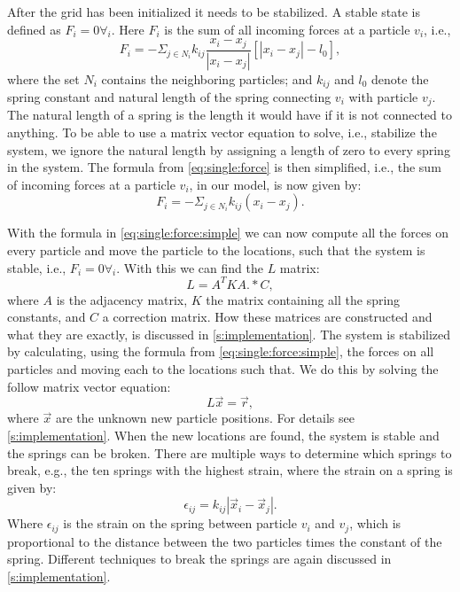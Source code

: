 After the grid has been initialized it needs to be stabilized. A stable state is defined as $F_i = 0 \forall_i$. Here $F_i$ is the sum of all incoming forces at a particle $v_i$, i.e.,
%
\begin{equation}\label{eq:single:force}
	F_i = - \Sigma_{j \in N_i} k_{ij} \frac{x_i - x_j}{|x_i - x_j|}[|x_i - x_j| - l_0],
\end{equation}
%
where the set $N_i$ contains the neighboring particles; and $k_{ij}$ and $l_0$ denote the spring constant and natural length of the spring connecting $v_i$ with 
particle $v_j$. The natural length of a spring is the length it would have if it is not connected to anything. To be able to use a matrix vector equation to solve, i.e., stabilize the system, we ignore the natural length by assigning a length of zero to every spring in the system. The formula from \eqref{eq:single:force} is then simplified, i.e., the sum of incoming forces at a particle $v_i$, in our model, is now given by:
%
\begin{equation}\label{eq:single:force:simple}
	F_i = - \Sigma_{j \in N_i} k_{ij}(x_i - x_j).
\end{equation}

With the formula in \eqref{eq:single:force:simple} we can now compute all the forces on every particle and move the particle to the locations, such that the system is stable, i.e., $F_i = 0 \forall_i$. With this we can find the $L$ matrix:
%
\begin{equation}\label{eq:method:stabilizationEquationLHS}
	L = A^T K A .* C,
\end{equation}
%
where $A$ is the adjacency matrix, $K$ the matrix containing all the spring constants, and $C$ a correction matrix. How these matrices are constructed and what they are exactly, is discussed in \cref{s:implementation}. The system is stabilized by calculating, using the formula from \eqref{eq:single:force:simple}, the forces on all particles and moving each to the locations such that. We do this by solving the follow matrix vector equation:
%
\begin{equation}\label{eq:method:stabilizationEquation}
	L\vec{x} = \vec{r},
\end{equation}
%
where $\vec{x}$ are the unknown new particle positions. For details see \cref{s:implementation}. When the new locations are found, the system is stable and the springs can be broken. There are multiple ways to determine which springs to break, e.g., the ten springs with the highest strain, where the strain on a spring is given by:
\begin{equation}\label{eq:spring:strain}
	\epsilon_{ij} = k_{ij} |\vec{x}_i - \vec{x}_j|.
\end{equation}
Where $\epsilon_{ij}$ is the strain on the spring between particle $v_i$ and $v_j$, which is proportional to the distance between the two particles times the constant of the spring. Different techniques to break the springs are again discussed in \cref{s:implementation}.

